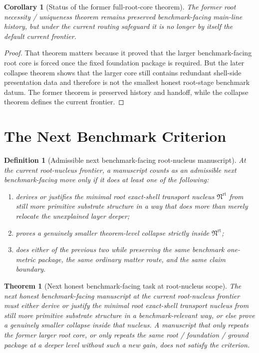 \documentclass[11pt]{article}
\newcommand{\RootNucleus}{\mathfrak N^{\mathrm{rt}}}
\newtheorem{definition}{Definition}
\newtheorem{corollary}{Corollary}
\newtheorem{theorem}{Theorem}
\begin{document}
\begin{corollary}[Status of the former full-root-core theorem]
The former root necessity / uniqueness theorem remains preserved benchmark-facing main-line history, but under the current routing safeguard it is no longer by itself the default current frontier.
\end{corollary}

\begin{proof}
That theorem matters because it proved that the larger benchmark-facing root core is forced once the fixed foundation package is required. But the later collapse theorem shows that the larger core still contains redundant shell-side presentation data and therefore is not the smallest honest root-stage benchmark datum. The former theorem is preserved history and handoff, while the collapse theorem defines the current frontier.
\end{proof}

\section{The Next Benchmark Criterion}

\begin{definition}[Admissible next benchmark-facing root-nucleus manuscript]
At the current root-nucleus frontier, a manuscript counts as an admissible next benchmark-facing move only if it does at least one of the following:
\begin{enumerate}
    \item derives or justifies the minimal root exact-shell transport nucleus \(\RootNucleus\) from still more primitive substrate structure in a way that does more than merely relocate the unexplained layer deeper;
    \item proves a genuinely smaller theorem-level collapse strictly inside \(\RootNucleus\);
    \item does either of the previous two while preserving the same benchmark one-metric package, the same ordinary matter route, and the same claim boundary.
\end{enumerate}
\end{definition}

\begin{theorem}[Next honest benchmark-facing task at root-nucleus scope]
The next honest benchmark-facing manuscript at the current root-nucleus frontier must either derive or justify the minimal root exact-shell transport nucleus from still more primitive substrate structure in a benchmark-relevant way, or else prove a genuinely smaller collapse inside that nucleus. A manuscript that only repeats the former larger root core, or only repeats the same root / foundation / ground package at a deeper level without such a new gain, does not satisfy the criterion.
\end{theorem}
\end{document}
